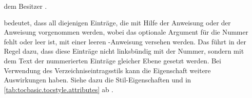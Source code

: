 \begin{description}
  dem Besitzer .
\item[\PValue{numberline}] %
  bedeutet, dass all diejenigen Einträge, die mit Hilfe der Anweisung
   oder der Anweisung
   vorgenommen werden,
  wobei das optionale Argument für die Nummer fehlt oder leer ist, mit einer
  leeren -Anweisung versehen werden. Das
  führt in der Regel dazu, dass diese Einträge nicht linksbündig mit der
  Nummer, sondern mit dem Text der nummerierten Einträge gleicher Ebene
  gesetzt werden. Bei Verwendung des
  Verzeichniseintragsstils  kann die Eigenschaft weitere
  Auswirkungen haben. Siehe dazu die Stil-Eigenschaften
   und  in
  \autoref{tab:tocbasic.tocstyle.attributes} ab
  .


\end{description}
